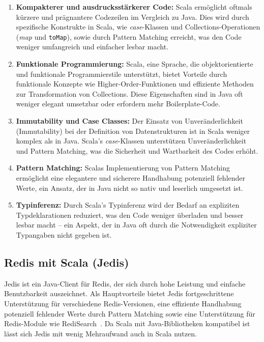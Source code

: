 \begin{enumerate}
    \item \textbf{Kompakterer und ausdrucksstärkerer Code:} Scala ermöglicht oftmals kürzere und prägnantere Codezeilen im Vergleich zu Java. Dies wird durch spezifische Konstrukte in Scala, wie \emph{case}-Klassen und Collections-Operationen (\emph{map} und \texttt{toMap}), sowie durch Pattern Matching erreicht, was den Code weniger umfangreich und einfacher lesbar macht.
    
    \item \textbf{Funktionale Programmierung:} Scala, eine Sprache, die objektorientierte und funktionale Programmierstile unterstützt, bietet Vorteile durch funktionale Konzepte wie Higher-Order-Funktionen und effiziente Methoden zur Transformation von Collections. Diese Eigenschaften sind in Java oft weniger elegant umsetzbar oder erfordern mehr Boilerplate-Code.
    
    \item \textbf{Immutability und Case Classes:} Der Einsatz von Unveränderlichkeit (Immutability) bei der Definition von Datenstrukturen ist in Scala weniger komplex als in Java. Scala's \emph{case}-Klassen unterstützen Unveränderlichkeit und Pattern Matching, was die Sicherheit und Wartbarkeit des Codes erhöht.
    
    \item \textbf{Pattern Matching:} Scalas Implementierung von Pattern Matching ermöglicht eine elegantere und sicherere Handhabung potenziell fehlender Werte, ein Ansatz, der in Java nicht so nativ und leserlich umgesetzt ist.
    
    \item \textbf{Typinferenz:} Durch Scala's Typinferenz wird der Bedarf an expliziten Typdeklarationen reduziert, was den Code weniger überladen und besser lesbar macht – ein Aspekt, der in Java oft durch die Notwendigkeit expliziter Typangaben nicht gegeben ist.
\end{enumerate}


\subsection{Redis mit Scala (Jedis)} %
Jedis ist ein Java-Client für Redis, der sich durch hohe Leistung und einfache Benutzbarkeit auszeichnet. Als Hauptvorteile bietet Jedis fortgeschrittene Unterstützung für verschiedene Redis-Versionen, eine effiziente Handhabung potenziell fehlender Werte durch Pattern Matching sowie eine Unterstützung für Redis-Module wie RediSearch~\cite{redis_inc_jedis_2023}.
Da Scala mit Java-Bibliotheken kompatibel ist lässt sich Jedis mit wenig Mehraufwand auch in Scala nutzen. %

